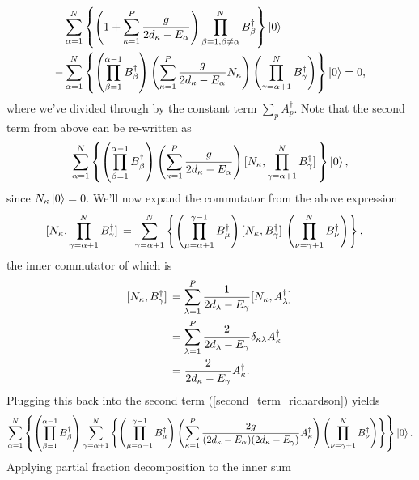 \documentclass[Dual]{msu-thesis}
\begin{document}
\begin{align}
\label{richardson_schrodinger_satisfied}
&\sum_{\alpha=1}^N
\left\{
\left(1+\sum_{\kappa=1}^P\frac{g}{2d_\kappa-E_\alpha}\right)
\prod_{\beta=1,\beta\neq\alpha}^NB^\dagger_\beta
\right\}
\ket{0}
\nonumber
\\
-&
\sum_{\alpha=1}^N
\left\{
\left(\prod_{\beta=1}^{\alpha-1}B^\dagger_\beta\right)
\left(
\sum_{\kappa=1}^P\frac{g}{2d_\kappa-E_\alpha}N_\kappa
\right)
\left(\prod_{\gamma=\alpha+1}^NB^\dagger_\gamma\right)
\right\}
\ket{0}
=0
,\end{align}
where we've divided through by the constant term $\sum_pA^\dagger_p$.
Note that the second term from above can be re-written as
\begin{align}
\label{second_term_richardson}
\sum_{\alpha=1}^N
\left\{
\left(\prod_{\beta=1}^{\alpha-1}B^\dagger_\beta\right)
\left(
\sum_{\kappa=1}^P\frac{g}{2d_\kappa-E_\alpha}
\right)
\comm*{N_\kappa}{\prod_{\gamma=\alpha+1}^NB^\dagger_\gamma}
\right\}
\ket{0}
,\end{align}
since $N_\kappa\ket{0}=0$. We'll now expand the commutator from the above expression
\begin{align}
\comm*{N_\kappa}{\prod_{\gamma=\alpha+1}^NB^\dagger_\gamma}
&=
\sum_{\gamma=\alpha+1}^N
\left\{
\left(\prod_{\mu=\alpha+1}^{\gamma-1} B^\dagger_\mu\right)
\comm*{N_\kappa}{B^\dagger_\gamma}
\left(\prod_{\nu=\gamma+1}^NB^\dagger_\nu\right)
\right\}
,\end{align}
the inner commutator of which is
\begin{align}
\comm*{N_\kappa}{B^\dagger_\gamma}
&=
\sum_{\lambda=1}^P\frac{1}{2d_\lambda-E_\gamma}
\comm*{N_\kappa}{A^\dagger_\lambda}
\\
&=
\sum_{\lambda=1}^P\frac{2}{2d_\lambda-E_\gamma}
\delta_{\kappa\lambda}A^\dagger_\kappa
\\
&=
\frac{2}{2d_\kappa-E_\gamma}
A^\dagger_\kappa.
\end{align}
Plugging this back into the second term (\ref{second_term_richardson}) yields
\begin{align}
\label{second_term_richardson3}
\sum_{\alpha=1}^N
\left\{
\left(\prod_{\beta=1}^{\alpha-1}B^\dagger_\beta\right)
\sum_{\gamma=\alpha+1}^N
\left\{
\left(\prod_{\mu=\alpha+1}^{\gamma-1} B^\dagger_\mu\right)
\left(
\sum_{\kappa=1}^P
\frac{2g}{(2d_\kappa-E_\alpha)(2d_\kappa-E_\gamma)}
A^\dagger_\kappa
\right)
\left(\prod_{\nu=\gamma+1}^NB^\dagger_\nu\right)
\right\}
\right\}
\ket{0}
.\end{align}
Applying partial fraction decomposition to the inner sum
\end{document}
